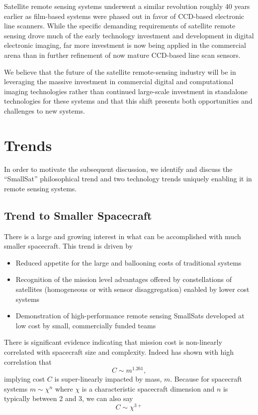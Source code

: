 \documentclass[]{spieman}  %
\begin{document}
Satellite remote sensing systems underwent a similar revolution roughly 40 years earlier as film-based systems were phased out in favor of CCD-based electronic line scanners.  While the specific demanding requirements of satellite remote sensing drove much of the early technology investment and development in digital electronic imaging, far more investment is now being applied in the commercial arena than in further refinement of now mature CCD-based line scan sensors.

We believe that the future of the satellite remote-sensing industry will be in leveraging the massive investment in commercial digital and computational imaging technologies rather than continued large-scale investment in standalone technologies for these systems and that this shift presents both opportunities and challenges to new systems.

\section{Trends}
In order to motivate the subsequent discussion, we identify and discuss the ``SmallSat'' philosophical trend and two technology trends uniquely enabling it in remote sensing systems.

\subsection{Trend to Smaller Spacecraft}

\label{sec:smallsat}
There is a large and growing interest in what can be accomplished with much smaller spacecraft.  This trend is driven by 
\begin{itemize}
    \item Reduced appetite for the large and ballooning costs of traditional systems
    \item Recognition of the mission level advantages offered by constellations of satellites (homogeneous or with sensor disaggregation) enabled by lower cost systems
    \item Demonstration of high-performance remote sensing SmallSats developed at low cost by small, commercially funded teams
\end{itemize} 

There is significant evidence indicating that mission cost is non-linearly correlated with spacecraft size and complexity.  Indeed \cite{bearden} has shown with high correlation that 
\begin{equation*}
    C \sim m^{1.261},
\end{equation*}
implying cost $C$ is super-linearly impacted by mass, $m$.  Because for spacecraft systems $m \sim \chi^n$ where $\chi$ is a characteristic spacecraft dimension and $n$ is typically between 2 and 3, we can also say
\begin{equation}
C \sim \chi^{3+}
\end{equation}
\end{document}
